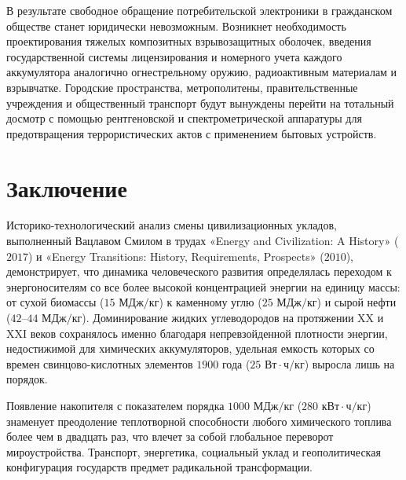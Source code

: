 \documentclass[12pt,a4paper]{article}
\begin{document}
В результате свободное обращение потребительской электроники в 
гражданском обществе станет юридически невозможным. Возникнет 
необходимость проектирования тяжелых композитных взрывозащитных 
оболочек, введения государственной системы лицензирования и номерного 
учета каждого аккумулятора аналогично огнестрельному оружию, 
радиоактивным материалам и взрывчатке. Городские пространства, 
метрополитены, правительственные учреждения и общественный транспорт 
будут вынуждены перейти на тотальный досмотр с помощью рентгеновской 
и спектрометрической аппаратуры для предотвращения террористических 
актов с применением бытовых устройств.

\section{Заключение}

Историко-технологический анализ смены цивилизационных укладов, 
выполненный Вацлавом Смилом в трудах «Energy and Civilization: 
A History» ($2017$) и «Energy Transitions: History, Requirements, 
Prospects» ($2010$), демонстрирует, что динамика человеческого 
развития определялась переходом к энергоносителям со все более 
высокой концентрацией энергии на единицу массы: от сухой биомассы 
($15\text{ МДж/кг}$) к каменному углю ($25\text{ МДж/кг}$) и 
сырой нефти ($42\text{--}44\text{ МДж/кг}$). Доминирование жидких 
углеводородов на протяжении XX и XXI веков сохранялось именно 
благодаря непревзойденной плотности энергии, недостижимой для 
химических аккумуляторов, удельная емкость которых со времен 
свинцово-кислотных элементов $1900$ года 
($25\text{ Вт}\cdot\text{ч/кг}$) выросла лишь на порядок.

Появление 
накопителя с показателем порядка $1000\text{ МДж/кг}$ 
($280\text{ кВт}\cdot\text{ч/кг}$) знаменует преодоление теплотворной 
способности любого химического топлива более чем в двадцать раз, что 
влечет за собой глобальное переворот мироустройства. Транспорт, 
энергетика, социальный уклад и геополитическая конфигурация государств
предмет радикальной трансформации.
\end{document}
